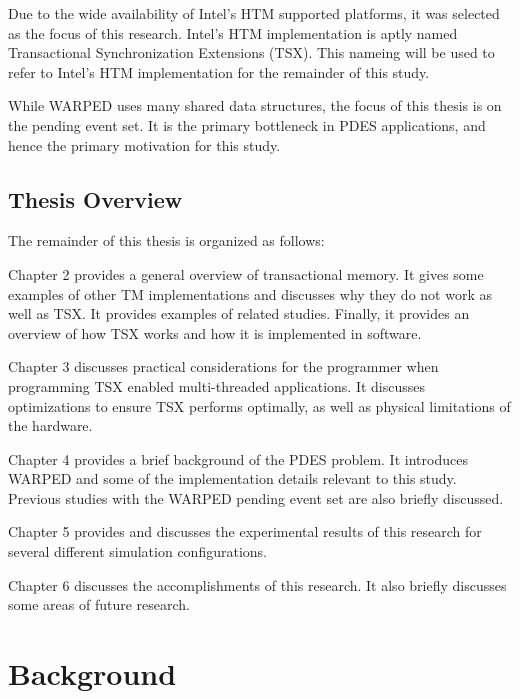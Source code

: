 \documentclass[a4paper]{article}
\begin{document}
\indent
Due to the wide availability of Intel's HTM supported platforms, it was
selected as the focus of this research.  Intel's HTM implementation is aptly
named Transactional Synchronization Extensions (TSX).  This nameing will be used
to refer to Intel's HTM implementation for the remainder of this study.
\par

\indent 
While WARPED uses many shared data structures, the focus of this thesis
is on the pending event set.  It is the primary bottleneck in PDES applications,
and hence the primary motivation for this study.
\par

\subsection{\textbf{Thesis Overview}}

The remainder of this thesis is organized as follows:
\par

\indent 
Chapter 2 provides a general overview of transactional memory.  It gives
some examples of other TM implementations and discusses why they do not work as
well as TSX.  It provides examples of related studies.  Finally, it provides an
overview of how TSX works and how it is implemented in software.
\par

\indent
Chapter 3 discusses practical considerations for the programmer when programming
TSX enabled multi-threaded applications.  It discusses optimizations to ensure
TSX performs optimally, as well as physical limitations of the hardware.
\par

\indent
Chapter 4 provides a brief background of the PDES problem.  It introduces
WARPED and some of the implementation details relevant to this study. Previous
studies with the WARPED pending event set are also briefly discussed.
\par

\indent
Chapter 5 provides and discusses the experimental results of this research for
several different simulation configurations.
\par

\indent
Chapter 6 discusses the accomplishments of this research.  It also briefly
discusses some areas of future research.
\par

\newpage

\section{\textbf{Background}}
\end{document}
